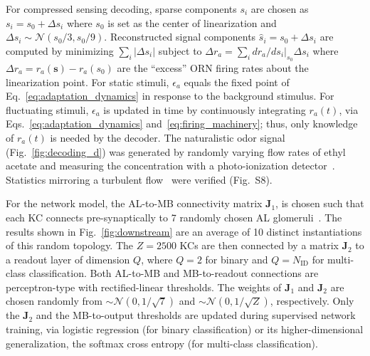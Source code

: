 \documentclass[9pt,twocolumn,twoside]{pnas-new}
\begin{document}
For compressed sensing decoding, sparse components $s_i$ are chosen as $s_i = s_0 + \Delta s_i$ where $s_0$ is set as the center of linearization and $\Delta s_i \sim \mathcal {N} (s_0/3, s_0/9)$. Reconstructed signal components $\hat {s} _i = s_0 + \Delta s_i$ are computed by minimizing $\sum_i |\Delta s_i|$ subject to $\Delta r_a = \sum_i dr_a/ds_i\big|_{s_0}\Delta  s_i$ where $\Delta r_a = r_a(\mathbf s) -  r_a(s_0)$ are the ``excess” ORN firing rates about the linearization point. For static stimuli, $\epsilon_a$ equals the fixed point of Eq.~\ref{eq:adaptation_dynamics} in response to the background stimulus. For fluctuating stimuli, $\epsilon_a$ is updated in time by continuously integrating  $r_a(t)$, via Eqs.~\ref{eq:adaptation_dynamics} and~\ref{eq:firing_machinery}; thus, only knowledge of $r_a(t)$ is needed by the decoder.
The naturalistic odor signal (Fig.~\ref{fig:decoding_d}) was generated by randomly varying flow rates of ethyl acetate and measuring the concentration with a photo-ionization detector~\cite{srinivas_elife}. Statistics mirroring a turbulent flow~\cite{celani} were verified (Fig.~S8).

For the network model, the AL-to-MB connectivity matrix $\mathbf {J}_1$, is chosen such that  each KC connects pre-synaptically to 7 randomly chosen AL glomeruli~\cite{litwinkumar,abbott_axel}. The results shown in Fig.~\ref{fig:downstream} are an average of 10 distinct instantiations of this random topology. The $Z=2500$ KCs are then connected by a matrix $\mathbf J_2$ to a readout layer of dimension $Q$, where $Q=2$ for binary and $Q=N_{\text{ID}}$ for multi-class classification. Both AL-to-MB and MB-to-readout connections are perceptron-type with rectified-linear thresholds. The weights of $\mathbf J_1$ and $\mathbf J_2$ are chosen randomly from $\sim \mathcal{N}(0, 1/\sqrt{7})$ and $\sim \mathcal{N}(0, 1/\sqrt{Z})$, respectively. Only the $\mathbf J_2$ and the MB-to-output thresholds are updated during supervised network training, via logistic regression (for binary classification) or its higher-dimensional generalization, the softmax cross entropy (for multi-class classification).




\showacknow
\end{document}
